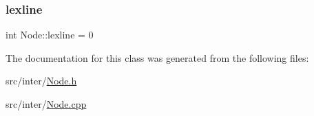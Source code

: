 \subsubsection{\texorpdfstring{lexline}{lexline}}
{\footnotesize\ttfamily int Node\+::lexline = 0}



The documentation for this class was generated from the following files\+:\begin{DoxyCompactItemize}
\item 
src/inter/\hyperlink{_node_8h}{Node.\+h}\item 
src/inter/\hyperlink{_node_8cpp}{Node.\+cpp}\end{DoxyCompactItemize}
